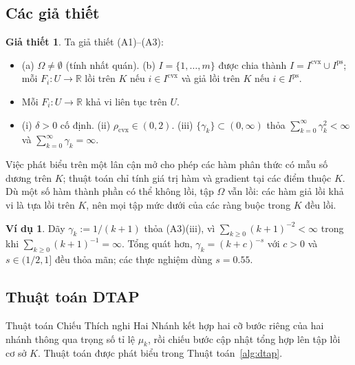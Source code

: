 \documentclass[]{interact}
\theoremstyle{plain}
\theoremstyle{definition}
\newtheorem{example}[theorem]{Ví dụ}
\newtheorem{assumption}{Giả thiết}
\theoremstyle{remark}
\newcommand{\R}{\mathbb{R}}
\newcommand{\cvx}{\mathrm{cvx}}
\newcommand{\ps}{\mathrm{ps}}
\begin{document}
\subsection{Các giả thiết}\label{ssec:assumptions}
\begin{assumption}\label{ass:standing}
Ta giả thiết \textup{(A1)--(A3)}:
\begin{itemize}[leftmargin=2.4em,itemsep=2pt]
\item[\textup{(A1)}] \textup{(a)} $\Omega\ne\emptyset$ (tính nhất quán). \textup{(b)} $I=\{1,\dots,m\}$
được chia thành $I=I^{\cvx}\cup I^{\ps}$; mỗi $F_i:U\to\R$ lồi trên $K$ nếu
$i\in I^{\cvx}$ và giả lồi trên $K$ nếu $i\in I^{\ps}$.
\item[\textup{(A2)}] Mỗi $F_i:U\to\R$ khả vi liên tục trên $U$.
\item[\textup{(A3)}] \textup{(i)} $\delta>0$ cố định. \textup{(ii)}
$\rho_{\cvx}\in(0,2)$. \textup{(iii)} $\{\gamma_k\}\subset(0,\infty)$ thỏa
$\sum_{k=0}^\infty\gamma_k^2<\infty$ và $\sum_{k=0}^\infty\gamma_k=\infty$.
\end{itemize}
\end{assumption}
Việc phát biểu trên một lân cận mở cho phép các hàm phân thức có mẫu số
dương trên $K$; thuật toán chỉ tính giá trị hàm và gradient tại các điểm thuộc $K$.
Dù một số hàm thành phần có thể không lồi, tập $\Omega$ vẫn lồi: các hàm giả lồi khả vi
là tựa lồi trên $K$, nên mọi tập mức dưới của các ràng buộc trong $K$ đều lồi.
\begin{example}\label{ex:gamma}
Dãy $\gamma_k:=1/(k+1)$ thỏa (A3)(iii), vì $\sum_{k\ge0}(k+1)^{-2}<\infty$
trong khi $\sum_{k\ge0}(k+1)^{-1}=\infty$. Tổng quát hơn, $\gamma_k=(k+c)^{-s}$ với $c>0$
và $s\in(1/2,1]$ đều thỏa mãn; các thực nghiệm dùng $s=0.55$.
\end{example}

\subsection{Thuật toán DTAP}\label{ssec:algorithm}
Thuật toán Chiếu Thích nghi Hai Nhánh kết hợp hai cỡ bước riêng của hai nhánh
thông qua trọng số tỉ lệ $\mu_k$, rồi chiếu bước cập nhật tổng hợp lên tập lồi cơ sở
$K$. Thuật toán được phát biểu trong Thuật toán~\ref{alg:dtap}.
\end{document}

